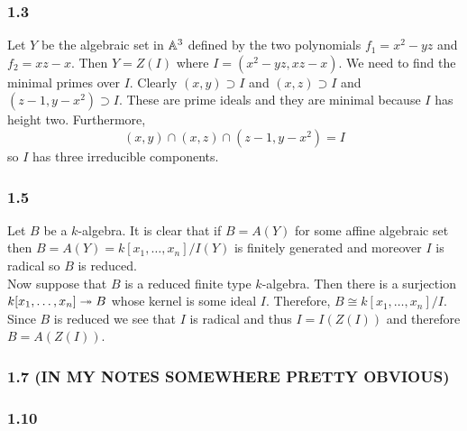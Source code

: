 \documentclass[12pt]{article}
\begin{document}
\subsubsection{1.3}

Let $Y$ be the algebraic set in $\mathbb{A}^3$ defined by the two polynomials $f_1 = x^2  - yz$ and $f_2 = xz - x$. Then $Y = Z(I)$ where $I = (x^2 - yz, xz - x)$. We need to find the minimal primes over $I$. Clearly $(x,y) \supset I$ and $(x,z) \supset I$ and $(z - 1, y - x^2) \supset I$. These are prime ideals and they are minimal because $I$ has height two. Furthermore,
\[ (x, y) \cap (x,z) \cap (z-1, y - x^2) = I \]
so $I$ has three irreducible components.

\subsubsection{1.5}

Let $B$ be a $k$-algebra. It is clear that if $B = A(Y)$ for some affine algebraic set then $B = A(Y) = k[x_1, \dots, x_n]/I(Y)$ is finitely generated and moreover $I$ is radical so $B$ is reduced.
\bigskip\\
Now suppose that $B$ is a reduced finite type $k$-algebra. Then there is a surjection $k[x_1, \dots, x_n] \twoheadrightarrow B$ whose kernel is some ideal $I$. Therefore, $B \cong k[x_1, \dots, x_n]/I$. Since $B$ is reduced we see that $I$ is radical and thus $I = I(Z(I))$ and therefore $B = A(Z(I))$.

\subsubsection{1.7 (IN MY NOTES SOMEWHERE PRETTY OBVIOUS)}

\subsubsection{1.10}
\end{document}
